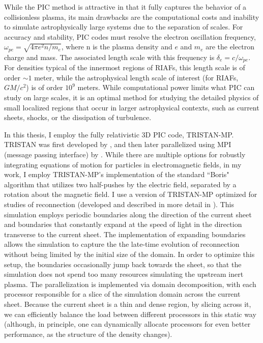 While the PIC method is attractive in that it fully captures the behavior of a collisionless plasma, its main drawbacks are the computational costs and inability to simulate astrophysically large systems due to the separation of scales.  For accuracy and stability, PIC codes must resolve the electron oscillation frequency, $\omega_{pe}=\sqrt{4 \pi e^2 n /m_e}$, where n is the plasma density and $e$ and $m_e$ are the electron charge and mass.  The associated length scale with this frequency is $\delta_e = c/\omega_{pe}$.  For densities typical of the innermost regions of RIAFs, this length scale is of order $\sim 1$ meter, while the astrophysical length scale of interest (for RIAFs, $GM/c^2$) is of order $10^9$ meters.  While computational power limits what PIC can study on large scales, it is an optimal method for studying the detailed physics of small localized regions that occur in larger astrophysical contexts, such as current sheets, shocks, or the dissipation of turbulence.

In this thesis, I employ the fully relativistic 3D PIC code, TRISTAN-MP.  TRISTAN was first developed by \citet{buneman1993}, and then later parallelized using MPI (message passing interface) by \citet{spitkovsky2005}.  While there are multiple options for robustly integrating equations of motion for particles in electromagnetic fields, in my work, I employ TRISTAN-MP's implementation of the standard ``Boris" algorithm that utilizes two half-pushes by the electric field, separated by a rotation about the magnetic field.  I use a version of TRISTAN-MP optimized for studies of reconnection (developed and described in more detail in \citealt{sironi2014}). This simulation employs periodic boundaries along the direction of the current sheet and boundaries that constantly expand at the speed of light in the direction transverse to the current sheet.  The implementation of expanding boundaries allows the simulation to capture the the late-time evolution of reconnection without being limited by the initial size of the domain.  In order to optimize this setup, the boundaries occasionally jump back towards the sheet, so that the simulation does not spend too many resources simulating the upstream inert plasma.  The parallelization is implemented via domain decomposition, with each processor responsible for a slice of the simulation domain across the current sheet.  Because the current sheet is a thin and dense region, by slicing across it, we can efficiently balance the load between different processors in this static way (although, in principle, one can dynamically allocate processors for even better performance, as the structure of the density changes). 

